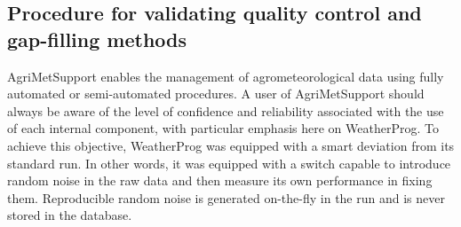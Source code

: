 \documentclass[authoryear,preprint,review,12pt]{elsarticle}
\newcommand{\statusblock}[3]{
    \ifthenelse{\equal{#2}{todo}}
        {\textcolor{red}{#1 (TO DO): #3}}
        {}
    \ifthenelse{\equal{#2}{wip}}
        {\textcolor{magenta}{#1 (IN PROGRESS): #3}}
        {}
    \ifthenelse{\equal{#2}{update}}
        {\textcolor{blue}{#1 (UPDATE): #3}}
        {}
    \ifthenelse{\equal{#2}{review}}
        {\textcolor{cyan}{#1 (REVIEW): #3}}
        {}
    \ifthenelse{\equal{#2}{done}}
        {\textcolor{PineGreen}{#1 (READY): #3}}
        {}
}
\begin{document}
\subsection{Procedure for validating quality control and gap-filling methods} \label{sec:QcheckValidation}
Agri\-Met\-Support enables the management of agrometeorological data using fully automated or semi-automated procedures. %
A user of AgriMetSupport should always be aware of the level of confidence and reliability associated with the use of each internal component, with particular emphasis here on WeatherProg. %
To achieve this objective, WeatherProg was equipped with a smart deviation from its standard run.
In other words, it was equipped with a switch capable to introduce random noise in the raw data and then measure its own performance in fixing them. %
Reproducible random noise is generated on-the-fly in the run and is never stored in the database.
\end{document}

